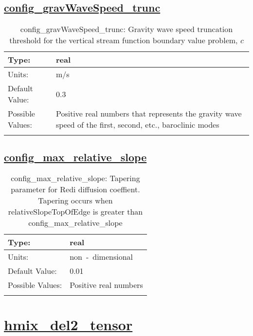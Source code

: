 \subsection[config\_gravWaveSpeed\_trunc]{\hyperref[sec:nm_tab_mesoscale_eddy_parameterization]{config\_gravWaveSpeed\_trunc}}
\label{subsec:nm_sec_config_gravWaveSpeed_trunc}
\begin{center}
\begin{longtable}{| p{2.0in} || p{4.0in} |}
    \hline
    Type: & real \\
    \hline
    Units: & \si{m/s} \\
    \hline
    Default Value: & 0.3 \\
    \hline
    Possible Values: & Positive real numbers that represents the gravity wave speed of the first, second, etc., baroclinic modes \\
    \hline
    \caption{config\_gravWaveSpeed\_trunc: Gravity wave speed truncation threshold for the vertical stream function boundary value problem, $c$}
\end{longtable}
\end{center}
\subsection[config\_max\_relative\_slope]{\hyperref[sec:nm_tab_mesoscale_eddy_parameterization]{config\_max\_relative\_slope}}
\label{subsec:nm_sec_config_max_relative_slope}
\begin{center}
\begin{longtable}{| p{2.0in} || p{4.0in} |}
    \hline
    Type: & real \\
    \hline
    Units: & \si{non-dimensional} \\
    \hline
    Default Value: & 0.01 \\
    \hline
    Possible Values: & Positive real numbers \\
    \hline
    \caption{config\_max\_relative\_slope: Tapering parameter for Redi diffusion coeffient.  Tapering occurs when relativeSlopeTopOfEdge is greater than config\_max\_relative\_slope}
\end{longtable}
\end{center}
\section[hmix\_del2\_tensor]{\hyperref[sec:nm_tab_hmix_del2_tensor]{hmix\_del2\_tensor}}
\label{sec:nm_sec_hmix_del2_tensor}

